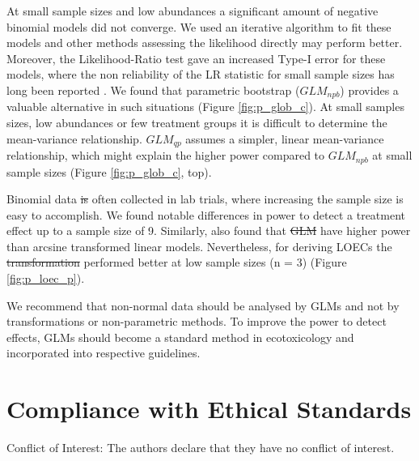 \documentclass[twocolumn, natbib]{svjour3}
\providecommand{\DIFadd}[1]{{\protect\color{blue}\uwave{#1}}} %
\providecommand{\DIFdel}[1]{{\protect\color{red}\sout{#1}}}                      %
\providecommand{\DIFaddbegin}{} %
\providecommand{\DIFaddend}{} %
\providecommand{\DIFdelbegin}{} %
\providecommand{\DIFdelend}{} %
\begin{document}
At small sample sizes and low abundances a significant amount of negative binomial models did not converge.
We used an iterative algorithm to fit these models \citep{venables_modern_2002} and other methods assessing the likelihood directly may perform better.
Moreover, the Likelihood-Ratio test gave an increased Type-I error for these models, where the non reliability of the LR statistic for small sample sizes has long been reported \citep{bolker_generalized_2009,wilks_large-sample_1938}. 
We found that parametric bootstrap ($GLM_{npb}$) provides a valuable alternative in such situations (Figure \ref{fig:p_glob_c}).
At small samples sizes, low abundances or few treatment groups it is difficult to determine the mean-variance relationship.
$GLM_{qp}$ assumes a simpler, linear mean-variance relationship, which might explain the higher power compared to $GLM_{npb}$ at small sample sizes (Figure \ref{fig:p_glob_c}, top).

Binomial data \DIFdelbegin \DIFdel{is }\DIFdelend \DIFaddbegin \DIFadd{are }\DIFaddend often collected in lab trials, where increasing the sample size is easy to accomplish. 
We found notable differences in power to detect a treatment effect up to a sample size of 9.
Similarly, \citet{warton_arcsine_2011} also found that \DIFdelbegin \DIFdel{GLM }\DIFdelend \DIFaddbegin \DIFadd{GLMs }\DIFaddend have higher power than arcsine transformed linear models.
Nevertheless, for deriving LOECs the \DIFdelbegin \DIFdel{transformation }\DIFdelend \DIFaddbegin \DIFadd{$LM$ }\DIFaddend performed better at low sample sizes (n = 3) (Figure \ref{fig:p_loec_p}). 

We recommend that non-normal data should be analysed by GLMs and not by transformations or non-parametric methods.
To improve the power to detect effects, GLMs should become a standard method in ecotoxicology and incorporated into respective guidelines.


\section{Compliance with Ethical Standards}
Conflict of Interest: The authors declare that they have no conflict of interest.



\end{document}
